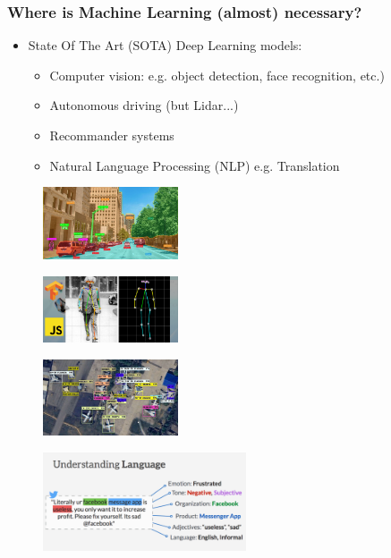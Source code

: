 \begin{frame}\frametitle{Where is Machine Learning (almost) necessary?}
   \begin{itemize}      
      \item State Of The Art (SOTA) Deep Learning models:
      \begin{itemize}
         \item Computer vision: e.g. object detection, face recognition, etc.)
         \item Autonomous driving (but Lidar...)
         \item Recommander systems
         \item Natural Language Processing (NLP) e.g. Translation
      \end{itemize}
   \end{itemize}
   \begin{minipage}{0.48\linewidth}
      \begin{figure}[H]
         \includegraphics[width=4cm]{../images/illustrations/objects-detection.jpeg}
      \end{figure}
   \end{minipage}
   \begin{minipage}{0.48\linewidth}
      \begin{figure}[H]
         \includegraphics[width=4cm]{../images/illustrations/posenet.png}
      \end{figure}
   \end{minipage}

   \begin{minipage}{0.48\linewidth}
      \begin{figure}[H]
         \includegraphics[width=4cm]{../images/illustrations/satellite.jpeg}
      \end{figure}
   \end{minipage}
   \begin{minipage}{0.48\linewidth}
      \begin{figure}[H]
         \includegraphics[width=6cm]{../images/illustrations/nlp.png}
      \end{figure}
   \end{minipage}


\end{frame}
